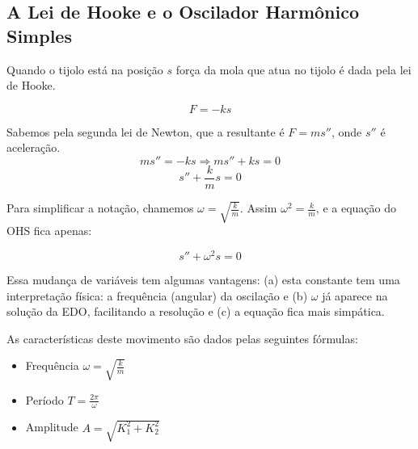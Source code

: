 \documentclass[a4paper]{article}
\providecommand{\sin}{} \renewcommand{\sin}{\hspace{2pt}\mathrm{sen}}
\begin{document}
\subsection{A Lei de Hooke e o Oscilador Harmônico Simples}


Quando o tijolo está na posição $s$ força da mola que atua no tijolo é
dada pela lei de Hooke.

\begin{displaymath}
  F = -ks
\end{displaymath}

Sabemos pela segunda lei de Newton, que a resultante é $F=m s''$, onde
$s''$ é aceleração.
\begin{displaymath}
  ms'' = -ks \Rightarrow ms'' +ks =0
\end{displaymath}
\begin{displaymath}
  s''+\frac{k}{m}s=0
\end{displaymath}


Para simplificar a notação, chamemos
$\omega=\sqrt{\frac{k}{m}}$. Assim $\omega^2 = \frac{k}{m}$, e a
equação do OHS fica apenas:

\begin{displaymath}
  s''+\omega^2s=0
\end{displaymath}

Essa mudança de variáveis tem algumas vantagens: (a) esta constante
tem uma interpretação física: a frequência (angular) da oscilação e
(b) $\omega$ já aparece na solução da EDO, facilitando a resolução e
(c) a equação fica mais simpática.



As características deste movimento são dados pelas seguintes fórmulas:

\begin{itemize}
\item Frequência $\omega = \sqrt{\frac{k}{m}}$
\item Período $T= \frac{2\pi}{\omega}$
\item Amplitude $A = \sqrt{K_1^2 + K_2^2}$
\end{itemize}
\end{document}
